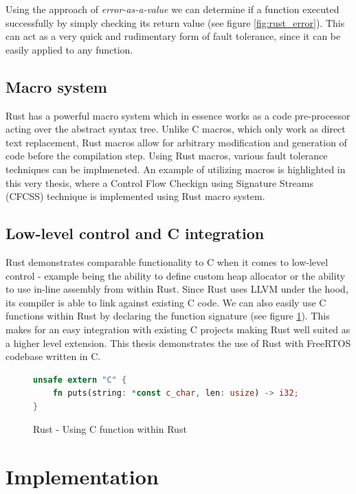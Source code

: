 \documentclass[12pt, letterpaper]{article}
\begin{document}
Using the approach of \textit{error-as-a-value} we can determine if a function executed successfully by simply checking its return value (see figure \ref{fig:rust_error}). This can act as a very quick and rudimentary form of fault tolerance, since it can be easily applied to any function.

\subsection{Macro system}
Rust has a powerful macro system which in essence works as a code pre-processor acting over the abstract syntax tree. Unlike C macros, which only work as direct text replacement, Rust macros allow for arbitrary modification and generation of code before the compilation step. Using Rust macros, various fault tolerance techniques can be implmeneted. An example of utilizing macros is highlighted in this very thesis, where a Control Flow Checkign using Signature Streams (CFCSS) technique is implemented using Rust macro system. 

\subsection{Low-level control and C integration}
Rust demonstrates comparable functionality to C when it comes to low-level control - example being the ability to define custom heap allocator or the ability to use in-line assembly from within Rust. Since Rust uses LLVM under the hood, its compiler is able to link against existing C code. We can also easily use C functions within Rust by declaring the function signature (see figure \ref{fig:rust_extern}). This makes for an easy integration with existing C projects making Rust well suited as a higher level extension. This thesis demonstrates the use of Rust with FreeRTOS codebase written in C.

\begin{figure}[!h]
\begin{lstlisting}[language=Rust]
unsafe extern "C" {
    fn puts(string: *const c_char, len: usize) -> i32;
}
\end{lstlisting}
\caption{Rust - Using C function within Rust}
\label{fig:rust_extern}
\end{figure}

\newpage

\section{Implementation}
\end{document}
